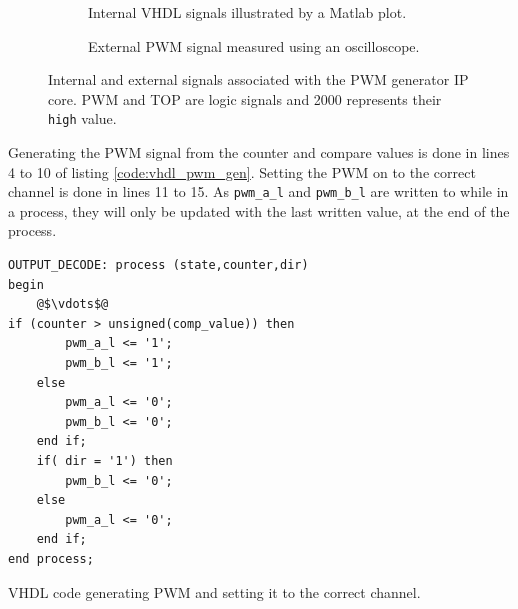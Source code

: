 \begin{figure}
    \centering
    \begin{subfigure}[b]{0.45\textwidth}
        
        \caption{Internal VHDL signals illustrated by a Matlab plot.}
        \label{sfig:pwm_gen_int}
    \end{subfigure}
    \begin{subfigure}[b]{0.45\textwidth}
        
        \caption{External PWM signal measured using an oscilloscope. }
        \label{sfig:pwm_gen_ext}
    \end{subfigure}
    \caption[Signals associated with the PWM generator IP core]{Internal and external signals associated with the PWM generator IP core. PWM and TOP are logic signals and 2000 represents their \texttt{high} value.}
    \label{fig:vhdl_pwm_gen}
\end{figure}

Generating the PWM signal from the counter and compare values is done in lines 4 to 10 of listing \ref{code:vhdl_pwm_gen}.
Setting the PWM on to the correct channel is done in lines 11 to 15.
As \texttt{pwm\_a\_l} and \texttt{pwm\_b\_l} are written to while in a process, they will only be updated with the last written value, at the end of the process.

\begin{listing}[H]
\begin{verbatim}
OUTPUT_DECODE: process (state,counter,dir)
begin
	@$\vdots$@
if (counter > unsigned(comp_value)) then
		pwm_a_l <= '1';
		pwm_b_l <= '1';
	else
		pwm_a_l <= '0';
		pwm_b_l <= '0';
	end if;	
	if( dir = '1') then 
		pwm_b_l <= '0';
	else 
		pwm_a_l <= '0';	
	end if;
end process;		
\end{verbatim}
\caption[VHDL code generating PWM signals.]{VHDL code generating PWM and setting it to the correct channel.}
\label{code:vhdl_pwm_gen}
\end{listing}

